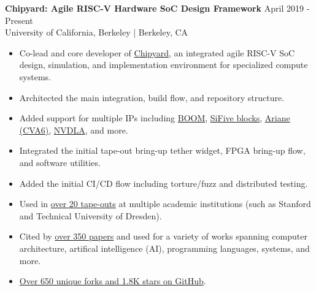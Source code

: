 \documentclass[line]{res}
\begin{document}
\begin{resume}
\label{sec:chipyard}
\textbf{Chipyard: Agile RISC-V Hardware SoC Design Framework} \hfill April 2019 - Present
\\
University of California, Berkeley | Berkeley, CA
\\
\vspace{-3mm}
\begin{itemize}
\item Co-lead and core developer of \href{https://github.com/ucb-bar/chipyard}{Chipyard}, an integrated agile RISC-V SoC design, simulation, and implementation environment for specialized compute systems.
\item Architected the main integration, build flow, and repository structure.
\item Added support for multiple IPs including \hyperref[sec:boom]{BOOM}, \href{https://github.com/chipsalliance/rocket-chip-blocks}{SiFive blocks}, \href{https://github.com/openhwgroup/cva6}{Ariane (CVA6)}, \href{https://nvdla.org/}{NVDLA}, and more.
\item Integrated the initial tape-out bring-up tether widget, FPGA bring-up flow, and software utilities.
\item Added the initial CI/CD flow including torture/fuzz and distributed testing.
\item Used in \href{https://scholar.google.com/scholar?cites=4549882523608568335&as_sdt=2005&sciodt=0,5&hl=en}{over 20 tape-outs} at multiple academic institutions (such as Stanford and Technical University of Dresden).
\item Cited by \href{https://scholar.google.com/scholar?cites=4549882523608568335&as_sdt=2005&sciodt=0,5&hl=en}{over 350 papers} and used for a variety of works spanning computer architecture, artifical intelligence (AI), programming languages, systems, and more.
\item \href{https://github.com/ucb-bar/chipyard}{Over 650 unique forks and 1.8K stars on GitHub}.
\end{itemize}

\vspace{-2mm}


\end{resume}
\end{document}
